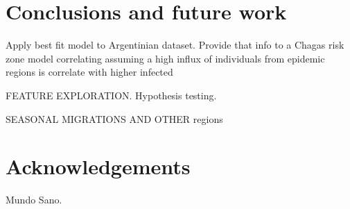 \section{Conclusions and future work}

Apply best fit model to Argentinian dataset. Provide that info to a Chagas risk zone model correlating assuming a high influx of individuals from epidemic regions is correlate with higher infected

FEATURE EXPLORATION. Hypothesis testing. 

SEASONAL MIGRATIONS AND OTHER regions



\section{Acknowledgements}
Mundo Sano.
